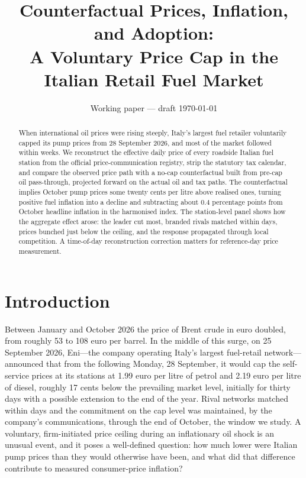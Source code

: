 \documentclass[11pt]{article}
\title{Counterfactual Prices, Inflation, and Adoption:\\
A Voluntary Price Cap in the Italian Retail Fuel Market}
\author{Working paper --- draft \today}
\date{}
\begin{document}
\maketitle

\begin{abstract}
\noindent When international oil prices were rising steeply, Italy's
largest fuel retailer voluntarily capped its pump prices from
28 September 2026, and most of the market followed within weeks. We
reconstruct the effective daily price of every roadside Italian fuel
station from the official price-communication registry, strip the
statutory tax calendar, and compare the observed price path with a no-cap
counterfactual built from pre-cap oil pass-through, projected forward on
the actual oil and tax paths. The counterfactual implies October pump
prices some twenty cents per litre above realised ones, turning positive
fuel inflation into a decline and subtracting about $0.4$ percentage
points from October headline inflation in the harmonised index. The station-level panel shows how the aggregate
effect arose: the leader cut most, branded rivals matched within days,
prices bunched just below the ceiling, and the response propagated
through local competition. A time-of-day reconstruction correction
matters for reference-day price measurement.
\end{abstract}

\section{Introduction}\label{sec:intro}

Between January and October 2026 the price of Brent crude in euro doubled,
from roughly 53 to 108 euro per barrel. In the middle of this surge, on
25 September 2026, Eni---the company operating Italy's largest fuel-retail
network---announced that from the following Monday, 28 September, it would
cap the self-service prices at its stations at 1.99 euro per litre of
petrol and 2.19 euro per litre of diesel, roughly 17 cents below the
prevailing market level, initially for thirty days with a possible extension
to the end of the year. Rival networks matched within days and the
commitment on the cap level was maintained, by the company's
communications, through the end of October, the window we study. A
voluntary, firm-initiated price ceiling during an inflationary oil shock is
an unusual event, and it poses a well-defined question: how much lower were
Italian pump prices than they would otherwise have been, and what did that
difference contribute to measured consumer-price inflation?
\end{document}
